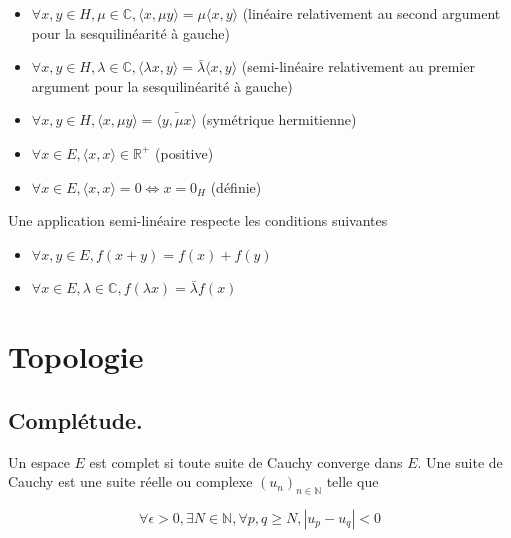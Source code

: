 \begin{itemize}
    \item $\forall x, y \in H, \mu \in \mathbb{C}, \langle x, \mu y \rangle = \mu \langle x, y \rangle$ (linéaire relativement au second argument pour la sesquilinéarité à gauche) \newline
    \item $\forall x, y \in H, \lambda \in \mathbb{C}, \langle \lambda x, y \rangle = \bar{\lambda} \langle x, y \rangle$  (semi-linéaire relativement au premier argument pour la sesquilinéarité à gauche) \newline
    \item $\forall x, y \in H, \langle x, \mu y \rangle = \bar{\langle y, \mu x \rangle}$ (symétrique hermitienne) \newline
    \item $\forall x \in E, \langle x, x \rangle \in \mathbb{R}^{+}$ (positive) \newline
    \item $\forall x \in E, \langle x, x \rangle = 0 \Longleftrightarrow x = 0_H$ (définie) \newline
\end{itemize}

\noindent Une application semi-linéaire respecte les conditions suivantes 

\begin{itemize}
    \item $\forall x, y \in E, f(x + y) = f(x) + f(y)$ \newline
    \item $\forall x \in E, \lambda \in \mathbb{C}, f(\lambda x) = \bar{\lambda} f(x)$ \newline
\end{itemize}

\section{Topologie}
\subsection{Complétude.} 

\noindent Un espace $E$ est complet si toute suite de Cauchy converge dans $E$. Une suite de Cauchy est une suite réelle ou complexe $(u_n)_{n \in \mathbb{N}}$ telle que 

\begin{equation}
    \forall \epsilon > 0, \exists N \in \mathbb{N}, \forall p, q \ge N, |u_p - u_q| < 0
\end{equation}


